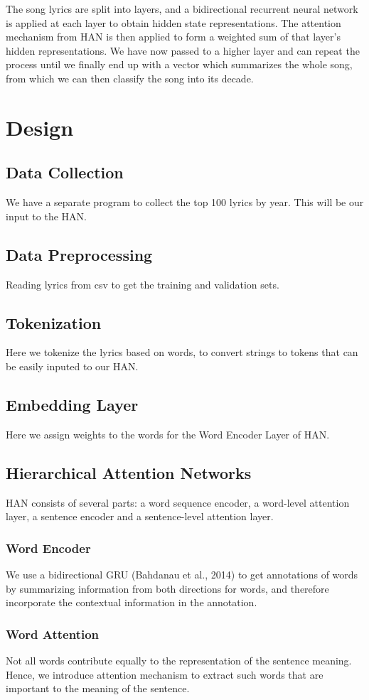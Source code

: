 \documentclass[a4paper,11pt,twocolumn]{article}
\begin{document}
The song lyrics are split into layers, and a bidirectional recurrent neural network is applied at each layer to obtain hidden state representations. The attention mechanism from HAN is then applied to form a weighted sum of that layer's hidden representations. We have now passed to a higher layer and can repeat the process until we finally end up with a vector which summarizes the whole song, from which we can then classify the song into its decade.
\section{Design}
\subsection{Data Collection} We have a separate program to collect the top 100 lyrics by year. This will be our input to the HAN.
\subsection{Data Preprocessing}
Reading lyrics from csv to get the training and validation sets.
\subsection{Tokenization} Here we tokenize the lyrics based on words, to convert strings to tokens that can be easily inputed to our HAN.
\subsection{Embedding Layer} Here we assign weights to the words for the Word Encoder Layer of HAN.
\subsection{Hierarchical Attention Networks} HAN consists of several parts: a word sequence encoder, a word-level attention layer, a sentence encoder and a sentence-level attention layer. 
\subsubsection{Word Encoder}
We use a bidirectional GRU (Bahdanau et al., 2014) to get annotations of words by summarizing information from both directions for words, and therefore incorporate the contextual information in the annotation.
\subsubsection{Word Attention}
Not all words contribute equally
to   the   representation   of   the   sentence   meaning.
Hence, we introduce attention mechanism to extract
such words that are important to the meaning of the
sentence.
\end{document}
